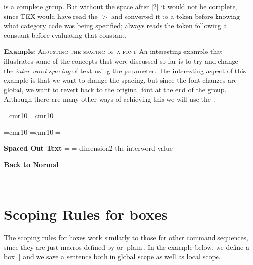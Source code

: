 \begin{teX}
{\catcode` >
\end{teX}

is a complete group. But without the space after |2|  it would not be complete, since TEX
would have read the |>|  and converted it to a token before knowing what category code
was being specified; \tex always reads the token following a constant before evaluating
that constant.

\topline

\textbf{Example}: \textsc{Adjusting the spacing of a font} An interesting example that illustrates some of the concepts that were discussed so far is to try and change the \textit{inter word spacing} of text using the  parameter. The interesting aspect of this example is that
we want to change the spacing, but since the font changes are global, we want to revert back to the original font at the end of the group. Although there are many other ways of achieving this we will use the .

\begin{teX}
\font \roman=cmr10
\font\specroman=cmr10
\newdimen\savedvalue
\savedvalue=\roman
\newdimen\specialvalue
\specialvalue=13.0pt
\def \rm{%
  \fontdimen2\roman=\savedvalue }
\def\specrm{%
  \aftergroup\restoredimen
  \fontdimen2\specroman=\specialvalue
  \specroman  }
\def\restoredimen{%
\fontdimen2\roman=\savedvalue }
\end{teX}
{
\font \roman=cmr10
\font\specroman=cmr10
\newdimen\savedvalue
\savedvalue=\roman
\newdimen\specialvalue
\specialvalue=13.0pt
\def \rm{%
  \fontdimen2\roman=\savedvalue }
\def\specrm{%
  \aftergroup\restoredimen
  \fontdimen2\specroman=\specialvalue
  \specroman  }
\def\restoredimen{%
\roman=\savedvalue }


{\bf Spaced Out Text} 
\medskip
{\specrm \lorem} dimension2 the interword   value \the{}\font


{\bf  Back to Normal}
\medskip

\rm
\lorem

}


\section{Scoping Rules for boxes}

The scoping rules for boxes work similarly to those for other command sequences, since they are just macros defined by \latex or |plain|. In the example below, we define a box |\mybox| and we save a sentence both in global scope as well as local scope.

